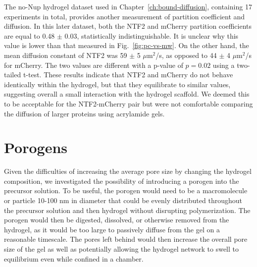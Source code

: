 The no-Nup hydrogel dataset used in Chapter~\ref{ch:bound-diffusion}, containing 17 experiments in total, provides another measurement of partition coefficient and diffusion.  In this later dataset, both the NTF2 and mCherry partition coefficients are equal to 0.48 $\pm$ 0.03, statistically indistinguishable.  It is unclear why this value is lower than that measured in Fig.~\ref{fig:pc-vs-mw}.  On the other hand, the mean diffusion constant of NTF2 was 59 $\pm$ 5 $\mu$m$^2$/s, as opposed to 44 $\pm$ 4 $\mu$m$^2$/s for mCherry.  The two values are different with a p-value of $p=0.02$ using a two-tailed t-test.  These results indicate that NTF2 and mCherry do not behave identically within the hydrogel, but that they equilibrate to similar values, suggesting overall a small interaction with the hydrogel scaffold.  We deemed this to be acceptable for the NTF2-mCherry pair but were not comfortable comparing the diffusion of larger proteins using acrylamide gels.
%
%

\section{Porogens}

Given the difficulties of increasing the average pore size by changing the hydrogel composition, we investigated the possibility of introducing a porogen into the precursor solution.  To be useful, the porogen would need to be a macromolecule or particle 10-100 nm in diameter that could be evenly distributed throughout the precursor solution and then hydrogel without disrupting polymerization.  The porogen would then be digested, dissolved, or otherwise removed from the hydrogel, as it would be too large to passively diffuse from the gel on a reasonable timescale.  The pores left behind would then increase the overall pore size of the gel as well as potentially allowing the hydrogel network to swell to equilibrium even while confined in a chamber.

